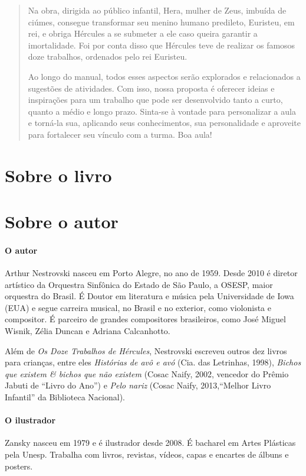 \documentclass[11pt]{extarticle}
\begin{document}
\begin{abstract}
Na obra, dirigida ao público infantil, Hera, mulher de Zeus, imbuída de ciúmes, consegue transformar seu menino humano predileto, Euristeu, em rei, e obriga Hércules a se submeter a ele caso queira garantir a imortalidade. Foi por conta disso que Hércules teve de realizar os famosos doze trabalhos, ordenados pelo rei Euristeu. 

Ao longo do manual, todos esses aspectos serão explorados e relacionados a sugestões de atividades. Com isso, nossa proposta é oferecer ideias e inspirações para um trabalho que pode ser desenvolvido tanto a curto, quanto a médio e longo prazo. Sinta-se à vontade para personalizar a aula e torná-la sua, aplicando seus conhecimentos, sua personalidade e aproveite para fortalecer seu vínculo com a turma. Boa aula! 

\end{abstract}

\section{Sobre o livro}

\section{Sobre o autor}

\paragraph{O autor} Arthur Nestrovski nasceu em Porto Alegre, no ano de 1959. Desde 2010 é diretor artístico da Orquestra Sinfônica do Estado de São Paulo, a OSESP, maior orquestra do Brasil. É Doutor em literatura e música pela Universidade de Iowa (EUA) e segue carreira musical, no Brasil e no exterior, como violonista e compositor. É parceiro de grandes compositores brasileiros, como José Miguel Wisnik, Zélia Duncan e Adriana Calcanhotto. 

Além de \textit{Os Doze Trabalhos de Hércules}, Nestrovski escreveu outros dez livros para crianças, entre eles \textit{Histórias de avô e avó} (Cia. das Letrinhas, 1998), \textit{Bichos que existem \& bichos que não existem} (Cosac
Naify, 2002, vencedor do Prêmio Jabuti de ``Livro do Ano'')
e \textit{Pelo nariz} (Cosac Naify, 2013,“Melhor Livro Infantil'' da Biblioteca Nacional). 

\paragraph{O ilustrador} Zansky nasceu em 1979 e é ilustrador desde 2008. É bacharel em Artes 
Plásticas pela Unesp. Trabalha com livros, revistas, vídeos, 
capas e encartes de álbuns e posters.  
\end{document}
